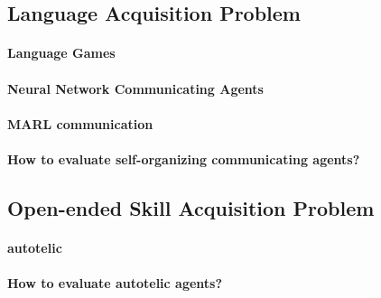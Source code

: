  \citet{oudeyer2005selforganization} \citet{steels1997evolution}


\subsection{Language Acquisition Problem}


\paragraph{Language Games}

\paragraph{Neural Network Communicating Agents}

\paragraph{MARL communication}

\paragraph{How to evaluate self-organizing communicating agents?}


\subsection{Open-ended Skill Acquisition Problem}

\paragraph{autotelic}

\paragraph{How to evaluate autotelic agents?}



